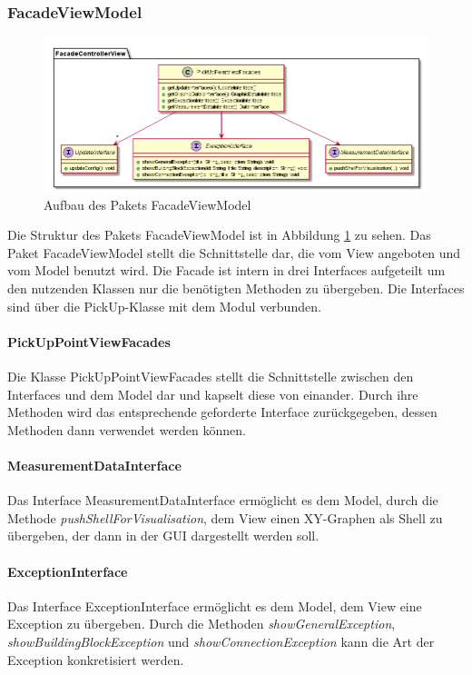 \documentclass[parskip=full]{scrartcl}
\begin{document}
\subsubsection{FacadeViewModel}

\begin{figure}[htbp]
	\begin{center}
		\includegraphics[width = 16cm]{Grafiken/FacadeViewModel.png}
		\caption{Aufbau des Pakets FacadeViewModel}
		\label{FacadeViewModel}
	\end{center}
\end{figure}

Die Struktur des Pakets FacadeViewModel ist in Abbildung \ref{FacadeViewModel} zu sehen. Das Paket FacadeViewModel stellt die Schnittstelle dar, die vom View angeboten und vom Model benutzt wird. Die Facade ist intern in drei Interfaces aufgeteilt um den nutzenden Klassen nur die benötigten Methoden zu übergeben. Die Interfaces sind über die PickUp-Klasse mit dem Modul verbunden.


\paragraph{PickUpPointViewFacades}
Die Klasse PickUpPointViewFacades stellt die Schnittstelle zwischen den Interfaces und dem Model dar und kapselt diese von einander. Durch ihre Methoden wird das entsprechende geforderte Interface zurückgegeben, dessen Methoden dann verwendet werden können.
\paragraph{MeasurementDataInterface}
Das Interface MeasurementDataInterface ermöglicht es dem Model, durch die Methode \textit{pushShellForVisualisation}, dem View einen XY-Graphen als Shell zu übergeben, der dann in der GUI dargestellt werden soll.
\paragraph{ExceptionInterface}
Das Interface ExceptionInterface ermöglicht es dem Model, dem View eine Exception zu übergeben. Durch die Methoden \textit{showGeneralException}, \textit{showBuildingBlockException} und \textit{showConnectionException} kann die Art der Exception konkretisiert werden.
\end{document}
